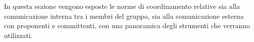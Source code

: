  In questa sezione vengono esposte le norme di coordinamento relative sia alla comunicazione interna tra i membri del gruppo, sia alla comunicazione esterna con proponenti e committenti, con una panoramica degli strumenti che verranno utilizzati.